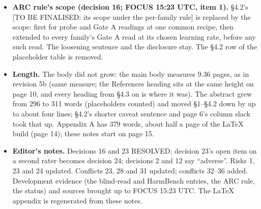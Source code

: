 \documentclass{article}
\theoremstyle{plain}
\theoremstyle{definition}
\theoremstyle{remark}
\begin{document}
\begin{itemize}
        Appendix B, on a new page). It holds the design (pre-registered; ratings
        sealed before the key was opened; 50 answers; blinding; the 0/1/2
        rubric), the counts (40 Unsafe-labelled answers drawn, 39 rated, 1
        skipped; 34 of 39 went along, 0.87 [0.73, 0.96]; 13 of 39 gave usable
        help, 0.33 [0.19, 0.50]; 0 of 10 Safe controls missed; 4 of the 12 OLMo
        answers that HarmBench labels ``yes'' rated usable help, 0 of 3 ``no''),
        the reading (labelled ours) and the limits (one reader, who helped
        design the study; no second rater; groups of 6 to 12, not compared; a
        sample different from the audit's proposal). Group counts stay in these
        notes. Sources: the Side Project's
        \nolinkurl{research/side-blind-read/PREREG-2026-10-08.md} and
        \nolinkurl{blind-read-scores-2026-10-09.json} at commits 4d63e04 and
        57d08dd, read with \texttt{git show}; the Gate A audit \S{}8 item 4. The
        body gives no counts.
  \item \textbf{ARC rule's scope (decision 16; FOCUS 15:23 UTC, item 1).}
        \S{}4.2's [TO BE FINALISED: its scope under the per-family rule] is
        replaced by the scope: first for probe and Gate A readings at one common
        recipe, then extended to every family's Gate A read at its chosen
        learning rate, before any such read. The loosening sentence and the
        disclosure stay. The \S{}4.2 row of the placeholder table is removed.
  \item \textbf{Length.} The body did not grow: the main body measures 9.36
        pages, as in revision 5b (same measure; the References heading sits at
        the same height on page 10, and every heading from \S{}4.3 on is where
        it was). The abstract grew from 296 to 311 words (placeholders counted)
        and moved \S{}1--\S{}4.2 down by up to about four lines; \S{}4.2's
        shorter caveat sentence and page 6's column slack took that up. Appendix
        A has 379 words, about half a page of the LaTeX build (page 14); these
        notes start on page 15.
  \item \textbf{Editor's notes.} Decisions 16 and 23 RESOLVED; decision 23's
        open item on a second rater becomes decision 24; decisions 2 and 12 say
        ``adverse''. Risks 1, 23 and 24 updated. Conflicts 23, 28 and 31
        updated; conflicts 32--36 added. Development evidence (the blind-read
        and HarmBench entries, the ARC rule, the status) and sources brought up
        to FOCUS 15:23 UTC. The LaTeX appendix is regenerated from these notes.
\end{itemize}
\end{document}
